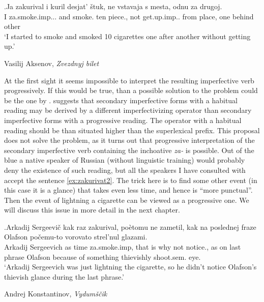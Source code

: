 \exg.\label{ex:zakurivat1}Ja zakurival i kuril desjat' \v{s}tuk, ne vstavaja s mesta, odnu za drugoj.\\
I za.smoke.imp... and smoke. ten piece., not get.up.imp.. from place, one behind other\\
\vspace{0.5em}
`I started to smoke and smoked 10 cigarettes one after another without getting up.'
\begin{flushright}
\vspace{-1em}
Vasilij Aksenov, \textit{Zvezdnyj bilet}
\end{flushright}

At the first sight it seems impossible to interpret the resulting imperfective verb progressively. If this would be true, than a possible solution to the problem could be the one by \citet{Ramchand:04}. \citet{Ramchand:04} suggests that secondary imperfective forms with a habitual reading may be derived by a different imperfectivizing operator than secondary imperfective forms with a progressive reading. The operator with a habitual reading should be than situated higher than the superlexical prefix. This proposal does not solve the problem, as it turns out that progressive interpretation of the secondary imperfective verb containing the inchoative \textit{za-} is possible. Out of the blue a native speaker of Russian (without linguistic training) would probably deny the existence of such reading, but all the speakers I have consulted with accept the sentence \ref{ex:zakurivat2}. The trick here is to find some other event (in this case it is a glance) that takes even less time, and hence is ``more punctual''. Then the event of lightning a cigarette can be viewed as a progressive one. We will discuss this issue in more detail in the next chapter.

\exg.\label{ex:zakurivat2}Arkadij Sergeevi\v{c} kak raz zakurival, po\`{e}tomu ne zametil, kak na poslednej fraze Olafson po\v{c}emu-to vorovato strel'nul glazami.\\
Arkadij Sergeevich as time za.smoke.imp, {that is why} not notice., as on last phrase Olafson {because of something} thievishly shoot.sem. eye.\\
\vspace{0.5em}
`Arkadij Sergeevich was just lightning the cigarette, so he didn't notice Olafson's thievish glance during the last phrase.'
\begin{flushright}
\vspace{-1em}
Andrej Konstantinov, \textit{Vydum\v{s}\v{c}ik}\\
\end{flushright}

